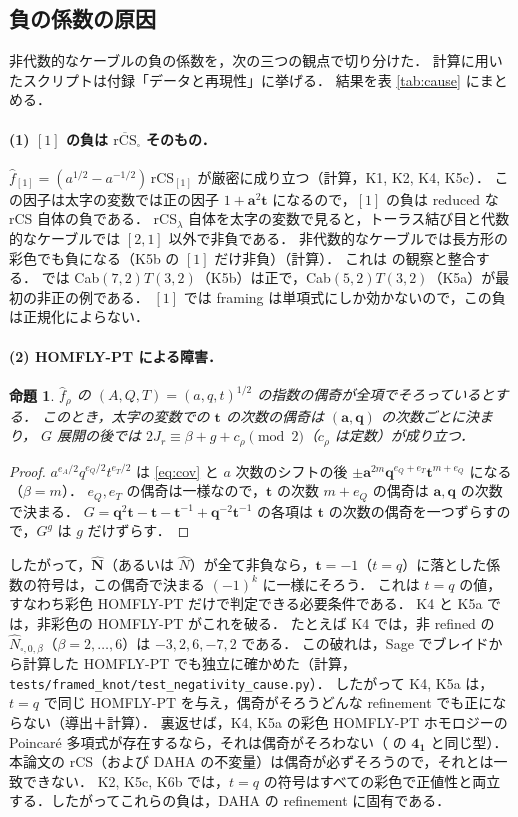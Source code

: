 \documentclass[11pt,a4paper]{ltjsarticle}
\newtheorem{proposition}{命題}[section]
\theoremstyle{definition}
\theoremstyle{remark}
\newcommand{\rCS}{\overline{\mathrm{rCS}}}
\newcommand{\ba}{\mathbf{a}}
\newcommand{\bq}{\mathbf{q}}
\newcommand{\bt}{\mathbf{t}}
\newcommand{\hN}{\widehat{N}}
\newcommand{\hf}{\widehat{f}}
\newcommand{\hbN}{\widehat{\mathbf{N}}}
\begin{document}
\subsection{負の係数の原因}\label{sec:cause}

非代数的なケーブルの負の係数を，次の三つの観点で切り分けた．
計算に用いたスクリプトは付録「データと再現性」に挙げる．
結果を表 \ref{tab:cause} にまとめる．

\paragraph{(1) $[1]$ の負は $\rCS_\square$ そのもの．}
$\hf_{[1]}=(a^{1/2}-a^{-1/2})\,\mathrm{rCS}_{[1]}$ が厳密に成り立つ（計算，K1, K2, K4, K5c）．
この因子は太字の変数では正の因子 $1+\ba^2\bt$ になるので，$[1]$ の負は reduced な rCS 自体の負である．
rCS$_\lambda$ 自体を太字の変数で見ると，トーラス結び目と代数的なケーブルでは $[2,1]$ 以外で非負である．
非代数的なケーブルでは長方形の彩色でも負になる（K5b の $[1]$ だけ非負）（計算）．
これは \cite{CD14} の観察と整合する．\cite{CD14} では Cab$(7,2)T(3,2)$（K5b）は正で，Cab$(5,2)T(3,2)$（K5a）が最初の非正の例である．
$[1]$ では framing は単項式にしか効かないので，この負は正規化によらない．

\paragraph{(2) HOMFLY-PT による障害．}
\begin{proposition}\label{prop:parity}
$\hf_\rho$ の $(A,Q,T)=(a,q,t)^{1/2}$ の指数の偶奇が全項でそろっているとする．
このとき，太字の変数での $\bt$ の次数の偶奇は $(\ba,\bq)$ の次数ごとに決まり，
$G$ 展開の後では $2J_r\equiv\beta+g+c_\rho \pmod 2$（$c_\rho$ は定数）が成り立つ．
\end{proposition}
\begin{proof}
$a^{e_A/2}q^{e_Q/2}t^{e_T/2}$ は \eqref{eq:cov} と $a$ 次数のシフトの後 $\pm\ba^{2m}\bq^{e_Q+e_T}\bt^{m+e_Q}$ になる（$\beta=m$）．
$e_Q,e_T$ の偶奇は一様なので，$\bt$ の次数 $m+e_Q$ の偶奇は $\ba,\bq$ の次数で決まる．
$G=\bq^2\bt-\bt-\bt^{-1}+\bq^{-2}\bt^{-1}$ の各項は $\bt$ の次数の偶奇を一つずらすので，$G^g$ は $g$ だけずらす．
\end{proof}
したがって，$\hbN$（あるいは $\hN$）が全て非負なら，$\bt=-1$（$t=q$）に落とした係数の符号は，この偶奇で決まる $(-1)^k$ に一様にそろう．
これは $t=q$ の値，すなわち彩色 HOMFLY-PT だけで判定できる必要条件である．
K4 と K5a では，非彩色の HOMFLY-PT がこれを破る．
たとえば K4 では，非 refined の $\hN_{\square,0,\beta}$（$\beta=2,\dots,6$）は $-3,2,6,-7,2$ である．
この破れは，Sage でブレイドから計算した HOMFLY-PT でも独立に確かめた（計算，\texttt{tests/framed_knot/test\_negativity\_cause.py}）．
したがって K4, K5a は，$t=q$ で同じ HOMFLY-PT を与え，偶奇がそろうどんな refinement でも正にならない（導出＋計算）．
裏返せば，K4, K5a の彩色 HOMFLY-PT ホモロジーの Poincaré 多項式が存在するなら，それは偶奇がそろわない（\cite{KN} の $\mathbf{4_1}$ と同じ型）．
本論文の rCS（および DAHA の不変量）は偶奇が必ずそろうので，それとは一致できない．
K2, K5c, K6b では，$t=q$ の符号はすべての彩色で正値性と両立する．したがってこれらの負は，DAHA の refinement に固有である．
\end{document}
